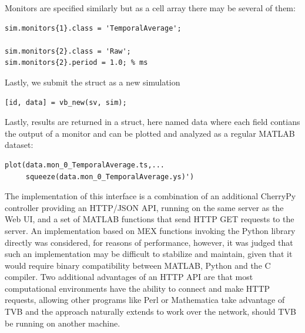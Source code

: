 Monitors are specified similarly but as a cell array there may be
several of them:

\begin{lstlisting}
sim.monitors{1}.class = 'TemporalAverage';

sim.monitors{2}.class = 'Raw';
sim.monitors{2}.period = 1.0; % ms
\end{lstlisting}


Lastly, we submit the struct as a new simulation

\begin{lstlisting}
[id, data] = vb_new(sv, sim);
\end{lstlisting}

\noindent Lastly, results are returned in a struct, here named data
where each field contians the output of a monitor and can be plotted
and analyzed as a regular MATLAB dataset:

\begin{lstlisting}
plot(data.mon_0_TemporalAverage.ts,...
     squeeze(data.mon_0_TemporalAverage.ys)')
\end{lstlisting}

The implementation of this interface is a combination of an additional
CherryPy controller providing an HTTP/JSON API, running on the same 
server as the Web UI, and a set of MATLAB functions that send HTTP 
GET requests to the server. An implementation based on MEX functions 
invoking the Python library directly was considered, for reasons of 
performance, however, it was judged that such an implementation may be
difficult to stabilize and maintain, given that it would require binary
compatibility between MATLAB, Python and the C compiler. Two additional 
advantages of an HTTP API are that most computational environments have
the ability to connect and make HTTP requests, allowing other programs 
like Perl or Mathematica take advantage of TVB and the approach naturally
extends to work over the network, should TVB be running on another machine.





